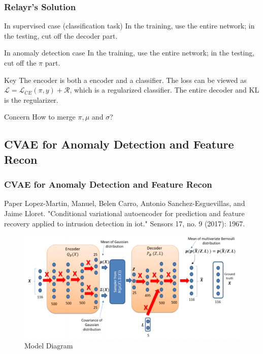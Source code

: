 \documentclass{beamer}
\begin{document}
\begin{frame}
\frametitle{Relayr's Solution}

\begin{block}{In supervised case (classification task)}
In the training, use the entire network; in the testing, cut off the decoder part.
\end{block}

\begin{block}{In anomaly detection case}
In the training, use the entire network; in the testing, cut off the $\pi$ part.
\end{block}

\begin{block}{Key}
The encoder is both a encoder and a classifier. The loss can be viewed as
$\mathcal{L} = \mathcal{L}_{CE}(\pi, y) + \mathcal{R}$, which is a regularized classifier. The entire decoder and KL is the regularizer.
\end{block}

\begin{block}{Concern}
How to merge $\pi, \mu$ and $\sigma$?
\end{block}

\end{frame}


\subsection{CVAE for Anomaly Detection and Feature Recon}
\begin{frame}
\frametitle{CVAE for Anomaly Detection and Feature Recon}
\begin{block}{Paper}
Lopez-Martin, Manuel, Belen Carro, Antonio Sanchez-Esguevillas, and Jaime Lloret. "Conditional variational autoencoder for prediction and feature recovery applied to intrusion detection in iot." Sensors 17, no. 9 (2017): 1967.
\end{block}

\begin{figure}
\includegraphics[width=0.8\linewidth]{figs/cvae_diagram.png}
\caption{Model Diagram}
\end{figure}

\end{frame}
\end{document}
